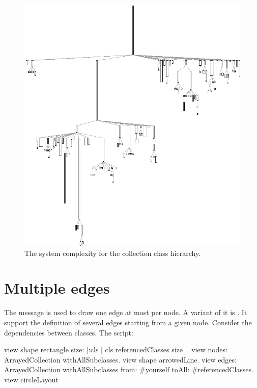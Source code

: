 \documentclass[a4paper,10pt,twoside]{book}
\begin{document}
\begin{figure}[htbp]
\centerline{\includegraphics[width=\linewidth]{picture5}}
\caption{The system complexity for the collection class hierarchy.}
\label{fig:picture5}
\end{figure}


\section{Multiple edges}

The message  is used to draw one edge at most per node. A variant of it is . It support the definition of several edges starting from a given node. Consider the dependencies between classes. The script: 

\begin{code}{}
view shape rectangle size: [:cls | cls referencedClasses size ].
view nodes: ArrayedCollection withAllSubclasses.
view shape arrowedLine.
view 
	edges: ArrayedCollection withAllSubclasses from: #yourself toAll: #referencedClasses.
view circleLayout
\end{code}
\end{document}

